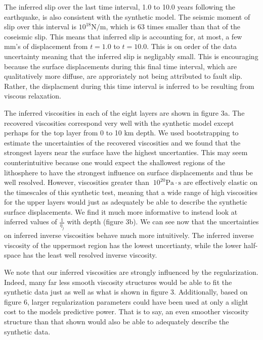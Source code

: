 \documentclass[12pt]{article}
\begin{document}
The inferred slip over the last time interval, 1.0 to 10.0 years
following the earthquake, is also consistent with the synthetic model.
The seismic moment of slip over this interval is $10^{18}\mathrm{N}/\mathrm{m}$,
which is 63 times smaller than that of the coseismic slip.  This
means that inferred slip is accounting for, at most, a few mm's of
displacement from $t=1.0$ to $t=10.0$.  This is on order of the data
uncertainty meaning that the inferred slip is negligably small.  This
is encouraging because the surface displacements during this final
time interval, which are qualitatively more diffuse, are approriately
not being attributed to fault slip.  Rather, the displacment during
this time interval is inferred to be resulting from viscous
relaxation.

The inferred viscosities in each of the eight layers are shown in
figure 3a.  The recovered viscosities correspond very well with the
synthetic model except perhaps for the top layer from 0 to 10 km
depth.  We used bootstrapping to estimate the uncertainties of the
recovered viscosities and we found that the strongest layers
near the surface have the highest uncertanties.  This may seem
counterintuitive because one would expect the shallowest regions of
the lithosphere to have the strongest influence on surface
displacements and thus be well resolved.  However, viscosities greater
than $~10^{20} \mathrm{Pa}\cdot\mathrm{s}$ are effectively elastic on
the timescales of this synthetic test, meaning that a wide range of
high viscosities for the upper layers would just as adequately be able
to describe the synthetic surface displacements.  We find it much more
informative to instead look at inferred values of $\frac{1}{\eta_j}$ with
depth (figure 3b).  We can see now that the uncertainties on inferred
inverse viscosities behave much more intuitively.  The inferred inverse
viscosity of the uppermost region has the lowest uncertianty, while
the lower half-space has the least well resolved inverse viscosity.

We note that our inferred viscosities are strongly influenced by the
regularization.  Indeed, many far less smooth viscosity structures
would be able to fit the synthetic data just as well as what is shown
in figure 3.  Additionally, based on figure 6, larger regularization
parameters could have been used at only a slight cost to the models
predictive power.  That is to say, an even smoother viscosity
structure than that shown would also be able to adequately describe the
synthetic data.
\end{document}
